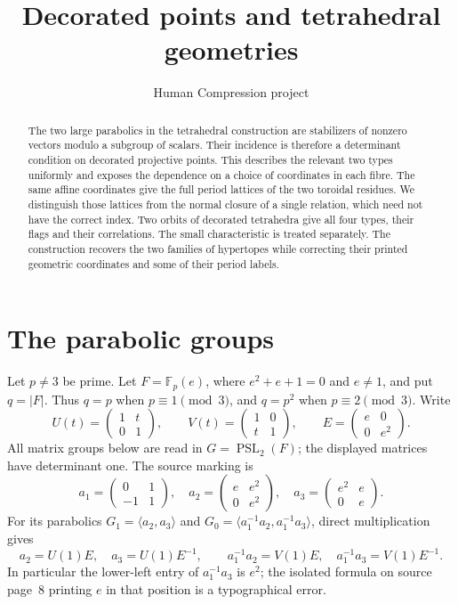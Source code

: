 \documentclass[11pt,a4paper]{article}
\title{Decorated points and tetrahedral geometries}
\author{Human Compression project}
\date{}
\newcommand{\gen}[1]{\langle #1\rangle}
\newcommand{\F}{\mathbb F}
\begin{document}
\maketitle

\begin{abstract}
The two large parabolics in the tetrahedral construction are stabilizers
of nonzero vectors modulo a subgroup of scalars. Their incidence is
therefore a determinant condition on decorated projective points.
This describes the relevant two types uniformly and exposes the
dependence on a choice of coordinates in each fibre. The same affine
coordinates give the full period lattices of the two toroidal residues.
We distinguish those lattices from the normal closure of a single
relation, which need not have the correct index. Two orbits of decorated
tetrahedra give all four types, their flags and their correlations.
The small characteristic is treated separately. The construction
recovers the two families of hypertopes while correcting their printed
geometric coordinates and some of their period labels.
\end{abstract}

\section{The parabolic groups}

Let $p\ne3$ be prime. Let $F=\F_p(e)$, where $e^2+e+1=0$ and
$e\ne1$, and put $q=|F|$. Thus $q=p$ when $p\equiv1\pmod3$,
and $q=p^2$ when $p\equiv2\pmod3$. Write
\[
 U(t)=\begin{pmatrix}1&t\\0&1\end{pmatrix},\qquad
 V(t)=\begin{pmatrix}1&0\\t&1\end{pmatrix},\qquad
 E=\begin{pmatrix}e&0\\0&e^2\end{pmatrix}.
\]
All matrix groups below are read in $G=\operatorname{PSL}_2(F)$;
the displayed matrices have determinant one. The source marking is
\[
 a_1=\begin{pmatrix}0&1\\-1&1\end{pmatrix},\quad
 a_2=\begin{pmatrix}e&e^2\\0&e^2\end{pmatrix},\quad
 a_3=\begin{pmatrix}e^2&e\\0&e\end{pmatrix}.
\]
For its parabolics $G_1=\gen{a_2,a_3}$ and
$G_0=\gen{a_1^{-1}a_2,a_1^{-1}a_3}$, direct multiplication gives
\[
 a_2=U(1)E,\quad a_3=U(1)E^{-1},\qquad
 a_1^{-1}a_2=V(1)E,\quad a_1^{-1}a_3=V(1)E^{-1}.
\]
In particular the lower-left entry of $a_1^{-1}a_3$ is $e^2$;
the isolated formula on source page~8 printing $e$ in that
position is a typographical error.
\end{document}
